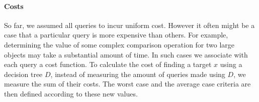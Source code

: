 \paragraph{Costs}
So far, we assumed all queries to incur uniform cost. However it often might be a case that a particular query is more expensive than others. For example, determining the value of some complex comparison operation for two large objects may take a substantial amount of time. In such cases we associate with each query a cost function. To calculate the cost of finding a target $x$ using a decision tree $D$, instead of measuring the amount of queries made using $D$, we measure the sum of their costs. The worst case and the average case criteria are then defined according to these new values.

